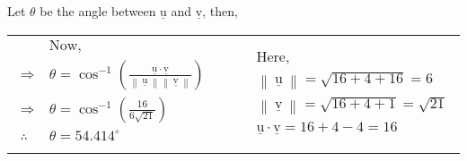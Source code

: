 \documentclass[12pt]{article}
\renewcommand{\vec}[1]{\underline{\mathrm{#1}}}
\newcommand{\norm}[1]{\left\lVert\ #1\ \right\rVert}
\begin{document}
\vspace{2ex}
Let $\theta$ be the angle between $\vec{u}$ and $\vec{v}$, then,\\
\begin{tabular}{lcl}
   $\begin{aligned}
      &\text{Now, }\\
      \Rightarrow \
      &\theta = \cos^{-1}\left(\frac{\vec{u}\cdot\vec{v}}{\norm{\vec{u}}\norm{\vec{v}}}\right)\\[1ex]
      \Rightarrow \
      &\theta = \cos^{-1}\left(\frac{16}{6 \sqrt{21}}\right)\\
      \therefore \
      &\theta = 54.414^{\circ}\\
   \end{aligned}$
   & \divideX &
   $\begin{aligned}
      &\text{Here, }\\
      &\norm{\vec{u}} = \sqrt{16+4+16} = 6\\
      &\norm{\vec{v}} = \sqrt{16+4+1} = \sqrt{21}\\
      &\vec{u}\cdot\vec{v} = 16+4-4 = 16
   \end{aligned}$
\end{tabular}
\end{document}
